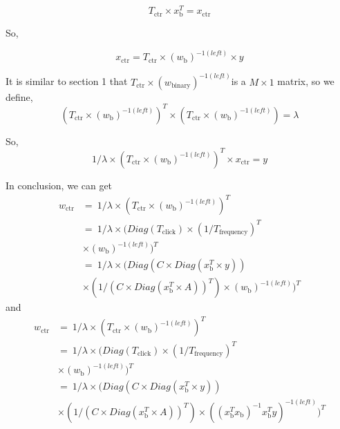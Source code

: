 \begin{equation}
T_{\text{ctr}} \times x_{\text{b}}^T =  x_{\text{ctr}}
\end{equation}

So,

\begin{equation}
 x_{\text{ctr}} =  T_{\text{ctr}} \times (w_{\text{b}})^{-1(left)} \times y 
\end{equation}

It is similar to section 1 that \(T_{\text{ctr}} \times (w_{\text{binary}})^{-1(left)}\)is a \(M \times 1\) matrix, so we define, 
\begin{equation}
(T_{\text{ctr}} \times (w_{\text{b}})^{-1(left)})^T \times (T_{\text{ctr}} \times (w_{\text{b}})^{-1(left)}) = \lambda
\end{equation}

So, 
\begin{equation}
1/{\lambda} \times (T_{\text{ctr}} \times (w_{\text{b}})^{-1(left)})^T \times x_{\text{ctr}} =  y
\end{equation}

In conclusion, we can get
\begin{equation} 
\begin{split}
w_{\text{ctr}} & =\ 1/{\lambda} \times (T_{\text{ctr}} \times (w_{\text{b}})^{-1(left)})^T \\
& = \ 1/{\lambda} \times (Diag(T_{\text{click}}) \times (1/T_{\text{frequency}} )^T \\ 
& \times (w_{\text{b}})^{-1(left)})^T \\
& = \ 1/{\lambda} \times (Diag(C \times Diag(x_{\text{b}}^T \times y)) \\ 
& \times (1/ (C \times Diag(x_{\text{b}}^T \times A) )^T) \times (w_{\text{b}})^{-1(left)})^T
\end{split}
\end{equation}
and
\begin{equation} 
\begin{split}
w_{\text{ctr}} & =\ 1/{\lambda} \times (T_{\text{ctr}} \times (w_{\text{b}})^{-1(left)})^T \\
& = \ 1/{\lambda} \times (Diag(T_{\text{click}}) \times (1/T_{\text{frequency}} )^T \\ 
& \times (w_{\text{b}})^{-1(left)})^T \\
& = \ 1/{\lambda} \times (Diag(C \times Diag(x_{\text{b}}^T \times y)) \\ 
& \times (1/ (C \times Diag(x_{\text{b}}^T \times A) )^T) \times ((x_{\text{b}}^T x_{\text{b}})^{-1} x_{\text{b}}^T y)^{-1(left)})^T
\end{split}
\end{equation}

